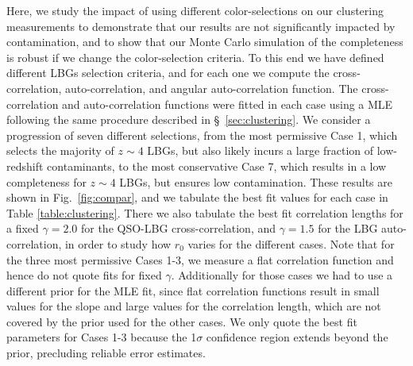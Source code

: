 \documentclass[iop, revtex4]{emulateapj}
\begin{document}
Here, we study the impact of using different color-selections on our
clustering measurements to demonstrate 
that our results are not significantly impacted by contamination, and to
show that our Monte Carlo simulation of the completeness is robust if we change the color-selection
criteria. 
To this end we have defined different LBGs selection criteria,
and for each one we compute the cross-correlation, auto-correlation,
and angular auto-correlation function. The cross-correlation and
auto-correlation functions were fitted in each case using a MLE
following the same procedure described in \S~\ref{sec:clustering}.
We consider a progression of seven different selections, from the most permissive Case 1,
which selects the majority of $z\sim4$ LBGs, but also likely
incurs a large fraction of low-redshift contaminants,
to the most conservative Case 7, which results in a low completeness
for  $z\sim4$ LBGs, but ensures low contamination.
These results are shown in Fig.~\ref{fig:compar}, and we tabulate the best
fit values for each case in Table \ref{table:clustering}. There
we also tabulate the best fit correlation lengths for a fixed $\gamma=2.0$ for the
QSO-LBG cross-correlation, and $\gamma=1.5$ for the LBG auto-correlation, in
order to study how $r_{0}$ varies for the different cases. 
Note that for the three most permissive Cases 1-3, we measure a flat correlation
function and hence do not quote fits for fixed $\gamma$.  Additionally for those cases we had to 
use a different prior for the MLE fit, since flat correlation functions result in
small values for the slope and large values for the correlation length,
which are not covered by the prior used for the other cases. We only quote the best fit parameters for 
Cases 1-3 because the 1$\sigma$ confidence region extends beyond the prior, precluding reliable
error estimates.
\end{document}
